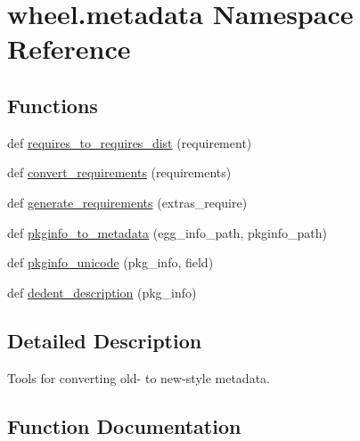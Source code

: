 \hypertarget{namespacewheel_1_1metadata}{}\section{wheel.\+metadata Namespace Reference}
\label{namespacewheel_1_1metadata}
\subsection*{Functions}
\begin{DoxyCompactItemize}
\item 
def \hyperlink{namespacewheel_1_1metadata_abd414d4e8d357ff4a844dfc7e9dbadce}{requires\+\_\+to\+\_\+requires\+\_\+dist} (requirement)
\item 
def \hyperlink{namespacewheel_1_1metadata_a7d4e9805baa0c8b9aefa0de1dec18289}{convert\+\_\+requirements} (requirements)
\item 
def \hyperlink{namespacewheel_1_1metadata_a59403b28370dbc99b661a0cfe6ef8928}{generate\+\_\+requirements} (extras\+\_\+require)
\item 
def \hyperlink{namespacewheel_1_1metadata_aa37a93d2d42385aab109e48f72755463}{pkginfo\+\_\+to\+\_\+metadata} (egg\+\_\+info\+\_\+path, pkginfo\+\_\+path)
\item 
def \hyperlink{namespacewheel_1_1metadata_ab406e279f8fbc5b9da29dc5c15dc952e}{pkginfo\+\_\+unicode} (pkg\+\_\+info, field)
\item 
def \hyperlink{namespacewheel_1_1metadata_a695b0aeec77feb2b546d795d2ea755f0}{dedent\+\_\+description} (pkg\+\_\+info)
\end{DoxyCompactItemize}


\subsection{Detailed Description}
\begin{DoxyVerb}Tools for converting old- to new-style metadata.
\end{DoxyVerb}
 

\subsection{Function Documentation}
\mbox{\label{namespacewheel_1_1metadata_a7d4e9805baa0c8b9aefa0de1dec18289}} 
